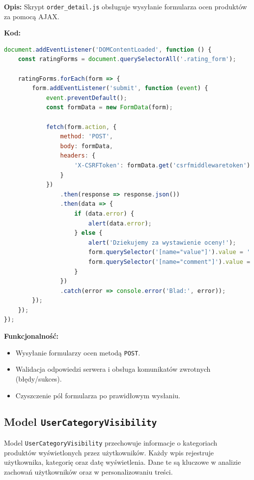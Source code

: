 \documentclass[12pt,a4paper,oneside]{article}
\theoremstyle{definition}
\numberwithin{equation}{section}
\begin{document}
\textbf{Opis:}  
Skrypt \texttt{order\_detail.js} obsługuje wysyłanie formularza ocen produktów za pomocą AJAX.

\textbf{Kod:}
\begin{lstlisting}[language=JavaScript]
document.addEventListener('DOMContentLoaded', function () {
    const ratingForms = document.querySelectorAll('.rating_form');

    ratingForms.forEach(form => {
        form.addEventListener('submit', function (event) {
            event.preventDefault();
            const formData = new FormData(form);

            fetch(form.action, {
                method: 'POST',
                body: formData,
                headers: {
                    'X-CSRFToken': formData.get('csrfmiddlewaretoken')
                }
            })
                .then(response => response.json())
                .then(data => {
                    if (data.error) {
                        alert(data.error);
                    } else {
                        alert('Dziekujemy za wystawienie oceny!');
                        form.querySelector('[name="value"]').value = '';
                        form.querySelector('[name="comment"]').value = '';
                    }
                })
                .catch(error => console.error('Blad:', error));
        });
    });
});
\end{lstlisting}

\textbf{Funkcjonalność:}
\begin{itemize}
    \item Wysyłanie formularzy ocen metodą \texttt{POST}.
    \item Walidacja odpowiedzi serwera i obsługa komunikatów zwrotnych (błędy/sukces).
    \item Czyszczenie pól formularza po prawidłowym wysłaniu.
\end{itemize}



% 
% 
\clearpage
\subsection{Model \texttt{UserCategoryVisibility}}

Model \texttt{UserCategoryVisibility} przechowuje informacje o kategoriach produktów wyświetlonych przez użytkowników. Każdy wpis rejestruje użytkownika, kategorię oraz datę wyświetlenia. Dane te są kluczowe w analizie zachowań użytkowników oraz w personalizowaniu treści.
\end{document}
